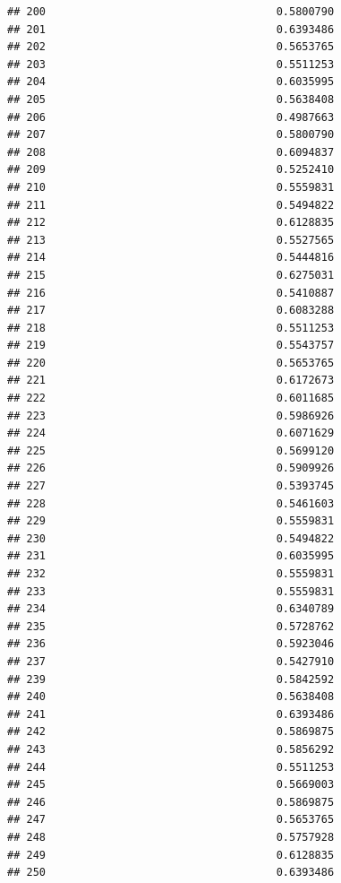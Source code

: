 \documentclass[
  american,
  man,floatsintext]{apa7}
\begin{document}
\begin{verbatim}
## 200                                    0.5800790
## 201                                    0.6393486
## 202                                    0.5653765
## 203                                    0.5511253
## 204                                    0.6035995
## 205                                    0.5638408
## 206                                    0.4987663
## 207                                    0.5800790
## 208                                    0.6094837
## 209                                    0.5252410
## 210                                    0.5559831
## 211                                    0.5494822
## 212                                    0.6128835
## 213                                    0.5527565
## 214                                    0.5444816
## 215                                    0.6275031
## 216                                    0.5410887
## 217                                    0.6083288
## 218                                    0.5511253
## 219                                    0.5543757
## 220                                    0.5653765
## 221                                    0.6172673
## 222                                    0.6011685
## 223                                    0.5986926
## 224                                    0.6071629
## 225                                    0.5699120
## 226                                    0.5909926
## 227                                    0.5393745
## 228                                    0.5461603
## 229                                    0.5559831
## 230                                    0.5494822
## 231                                    0.6035995
## 232                                    0.5559831
## 233                                    0.5559831
## 234                                    0.6340789
## 235                                    0.5728762
## 236                                    0.5923046
## 237                                    0.5427910
## 239                                    0.5842592
## 240                                    0.5638408
## 241                                    0.6393486
## 242                                    0.5869875
## 243                                    0.5856292
## 244                                    0.5511253
## 245                                    0.5669003
## 246                                    0.5869875
## 247                                    0.5653765
## 248                                    0.5757928
## 249                                    0.6128835
## 250                                    0.6393486

\end{verbatim}
\end{document}
